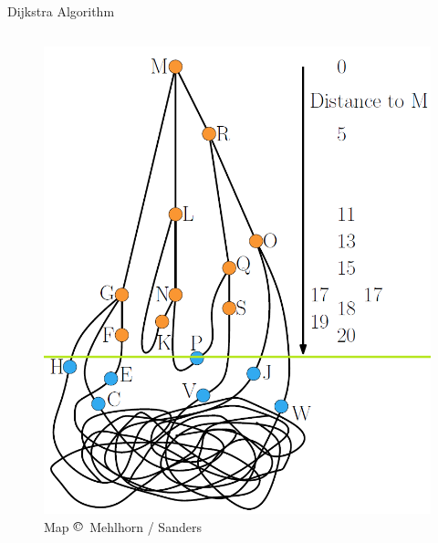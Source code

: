 \begin{frame}{Dijkstra Algorithm}
\begin{columns}
\begin{column}{0.45\linewidth}
\begin{figure}[!t]
        \includegraphics[width=\linewidth]
        {Images/Dijkstra/DijkstraTree_WithOverlay}
        \vspace{-0.5em}
        \caption{Map $\copyright\,$ Mehlhorn / Sanders}
      \end{figure}
    \end{column}
  \end{columns}
\end{frame}


